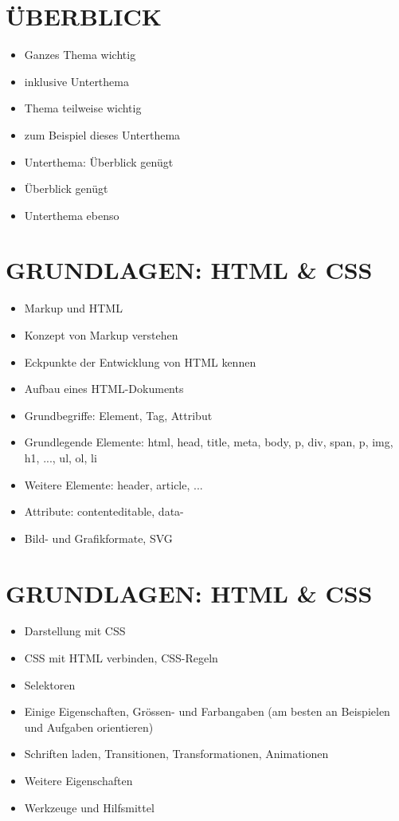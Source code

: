 \documentclass[10pt]{article}
\begin{document}
\section*{ÜBERBLICK}
\begin{itemize}
  \item Ganzes Thema wichtig
  \item inklusive Unterthema
  \item Thema teilweise wichtig
  \item zum Beispiel dieses Unterthema
  \item Unterthema: Überblick genügt
  \item Überblick genügt
  \item Unterthema ebenso
\end{itemize}

\section*{GRUNDLAGEN: HTML \& CSS}
\begin{itemize}
  \item Markup und HTML
  \item Konzept von Markup verstehen
  \item Eckpunkte der Entwicklung von HTML kennen
  \item Aufbau eines HTML-Dokuments
  \item Grundbegriffe: Element, Tag, Attribut
  \item Grundlegende Elemente: html, head, title, meta, body, p, div, span, p, img, h1, ..., ul, ol, li
  \item Weitere Elemente: header, article, ...
  \item Attribute: contenteditable, data-
  \item Bild- und Grafikformate, SVG
\end{itemize}

\section*{GRUNDLAGEN: HTML \& CSS}
\begin{itemize}
  \item Darstellung mit CSS
  \item CSS mit HTML verbinden, CSS-Regeln
  \item Selektoren
  \item Einige Eigenschaften, Grössen- und Farbangaben (am besten an Beispielen und Aufgaben orientieren)
  \item Schriften laden, Transitionen, Transformationen, Animationen
  \item Weitere Eigenschaften
  \item Werkzeuge und Hilfsmittel
\end{itemize}
\end{document}
